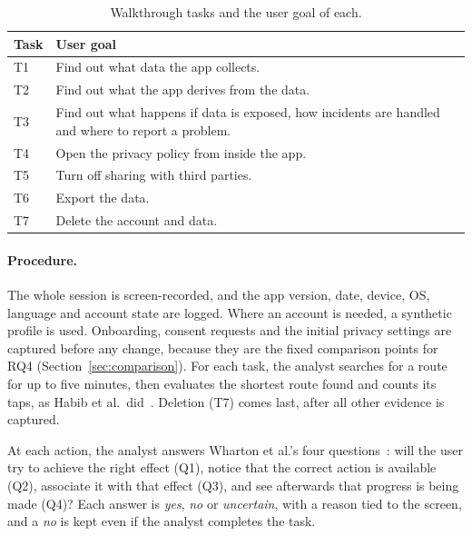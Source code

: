 \begin{table}[H]
\centering
\begin{singlespace}
\caption[Walkthrough tasks]{Walkthrough tasks and the user goal of each.}
\label{tab:wt-tasks}
\footnotesize
\begin{tabularx}{0.75\textwidth}{@{}l>{\raggedright\arraybackslash}X@{}}
\toprule
\textbf{Task} & \textbf{User goal} \\
\midrule
T1 & Find out what data the app collects. \\
T2 & Find out what the app derives from the data. \\
T3 & Find out what happens if data is exposed, how incidents are handled and where to report a problem. \\
T4 & Open the privacy policy from inside the app. \\
T5 & Turn off sharing with third parties. \\
T6 & Export the data. \\
T7 & Delete the account and data. \\
\bottomrule
\end{tabularx}
\end{singlespace}
\end{table}

\paragraph{Procedure.} The whole session is screen-recorded, and the app version, date, device,
OS, language and account state are logged. Where an account is needed, a synthetic profile is
used. Onboarding, consent requests and the initial privacy settings are captured before any
change, because they are the fixed comparison points for RQ4
(Section~\ref{sec:comparison}). For each task, the analyst searches for a route for up to five
minutes, then evaluates the shortest route found and counts its taps, as Habib et al.\
did~\parencite[Table~1, p.~4]{habib2020scavenger}. Deletion (T7) comes last, after all other
evidence is captured.

At each action, the analyst answers Wharton et al.'s four
questions~\parencite[Table~5.1, p.~106]{wharton1994cognitive}: will the user try to achieve the
right effect (Q1), notice that the correct action is available (Q2), associate it with that
effect (Q3), and see afterwards that progress is being made (Q4)? Each answer is \emph{yes},
\emph{no} or \emph{uncertain}, with a reason tied to the screen, and a \emph{no} is kept even if
the analyst completes the task.

